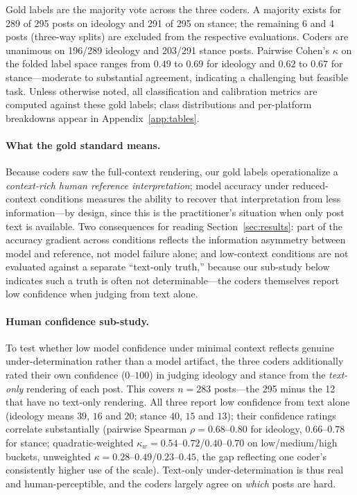 \documentclass[11pt]{article}
\begin{document}
Gold labels are the majority vote across the three coders. A majority exists for 289 of 295 posts on ideology and 291 of 295 on stance; the remaining 6 and 4 posts (three-way splits) are excluded from the respective evaluations. Coders are unanimous on 196/289 ideology and 203/291 stance posts. Pairwise Cohen's $\kappa$ on the folded label space ranges from $0.49$ to $0.69$ for ideology and $0.62$ to $0.67$ for stance---moderate to substantial agreement, indicating a challenging but feasible task. Unless otherwise noted, all classification and calibration metrics are computed against these gold labels; class distributions and per-platform breakdowns appear in Appendix~\ref{app:tables}.

\paragraph{What the gold standard means.}
Because coders saw the full-context rendering, our gold labels operationalize a \emph{context-rich human reference interpretation}; model accuracy under reduced-context conditions measures the ability to recover that interpretation from less information---by design, since this is the practitioner's situation when only post text is available. Two consequences for reading Section~\ref{sec:results}: part of the accuracy gradient across conditions reflects the information asymmetry between model and reference, not model failure alone; and low-context conditions are not evaluated against a separate ``text-only truth,'' because our sub-study below indicates such a truth is often not determinable---the coders themselves report low confidence when judging from text alone.

\paragraph{Human confidence sub-study.}
To test whether low model confidence under minimal context reflects genuine under-determination rather than a model artifact, the three coders additionally rated their own confidence ($0$--$100$) in judging ideology and stance from the \emph{text-only} rendering of each post. This covers $n{=}283$ posts---the 295 minus the 12 that have no text-only rendering. All three report low confidence from text alone (ideology means $39$, $16$ and $20$; stance $40$, $15$ and $13$); their confidence ratings correlate substantially (pairwise Spearman $\rho{=}0.68$--$0.80$ for ideology, $0.66$--$0.78$ for stance; quadratic-weighted $\kappa_w{=}0.54$--$0.72$/$0.40$--$0.70$ on low/medium/high buckets, unweighted $\kappa{=}0.28$--$0.49$/$0.23$--$0.45$, the gap reflecting one coder's consistently higher use of the scale). Text-only under-determination is thus real and human-perceptible, and the coders largely agree on \emph{which} posts are hard.
\end{document}
